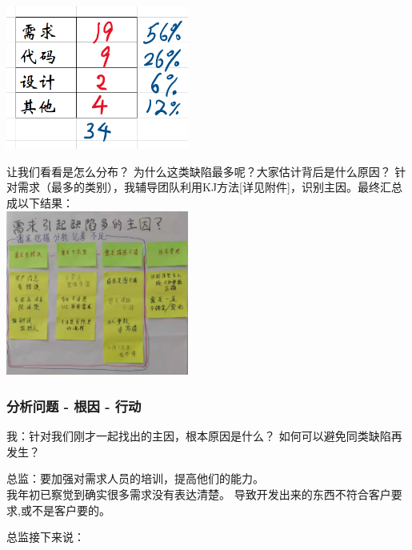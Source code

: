
\includegraphics[width=6cm]{DefectsBySourceScreenshot_2021-09-20_155232.png}

让我们看看是怎么分布？ 为什么这类缺陷最多呢？大家估计背后是什么原因？
针对需求（最多的类别），我辅导团队利用KJ方法{[}详见附件{]}，识别主因。最终汇总成以下结果：\\

\includegraphics[width=6cm]{!!reqKJfinal微信图片_20210920125228.jpg}

\hypertarget{ux5206ux6790ux95eeux9898---ux6839ux56e0---ux884cux52a8}{%
\subsubsection{分析问题 - 根因 -
行动}\label{ux5206ux6790ux95eeux9898---ux6839ux56e0---ux884cux52a8}}

我：针对我们刚才一起找出的主因，根本原因是什么？
如何可以避免同类缺陷再发生？

总监：要加强对需求人员的培训，提高他们的能力。\\
我年初已察觉到确实很多需求没有表达清楚。
导致开发出来的东西不符合客户要求,或不是客户要的。

总监接下来说：

